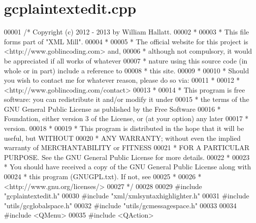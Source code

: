 \hypertarget{gcplaintextedit_8cpp_source}{\section{gcplaintextedit.\-cpp}
}

\begin{DoxyCode}
00001 \textcolor{comment}{/* Copyright (c) 2012 - 2013 by William Hallatt.}
00002 \textcolor{comment}{ *}
00003 \textcolor{comment}{ * This file forms part of "XML Mill".}
00004 \textcolor{comment}{ *}
00005 \textcolor{comment}{ * The official website for this project is <http://www.goblincoding.com> and,}
00006 \textcolor{comment}{ * although not compulsory, it would be appreciated if all works of whatever}
00007 \textcolor{comment}{ * nature using this source code (in whole or in part) include a reference to}
00008 \textcolor{comment}{ * this site.}
00009 \textcolor{comment}{ *}
00010 \textcolor{comment}{ * Should you wish to contact me for whatever reason, please do so via:}
00011 \textcolor{comment}{ *}
00012 \textcolor{comment}{ *                 <http://www.goblincoding.com/contact>}
00013 \textcolor{comment}{ *}
00014 \textcolor{comment}{ * This program is free software: you can redistribute it and/or modify it
       under}
00015 \textcolor{comment}{ * the terms of the GNU General Public License as published by the Free
       Software}
00016 \textcolor{comment}{ * Foundation, either version 3 of the License, or (at your option) any later}
00017 \textcolor{comment}{ * version.}
00018 \textcolor{comment}{ *}
00019 \textcolor{comment}{ * This program is distributed in the hope that it will be useful, but WITHOUT}
00020 \textcolor{comment}{ * ANY WARRANTY; without even the implied warranty of MERCHANTABILITY or
       FITNESS}
00021 \textcolor{comment}{ * FOR A PARTICULAR PURPOSE.  See the GNU General Public License for more
       details.}
00022 \textcolor{comment}{ *}
00023 \textcolor{comment}{ * You should have received a copy of the GNU General Public License along with}
00024 \textcolor{comment}{ * this program (GNUGPL.txt).  If not, see}
00025 \textcolor{comment}{ *}
00026 \textcolor{comment}{ *                    <http://www.gnu.org/licenses/>}
00027 \textcolor{comment}{ */}
00028 
00029 \textcolor{preprocessor}{#include "gcplaintextedit.h"}
00030 \textcolor{preprocessor}{#include "xml/xmlsyntaxhighlighter.h"}
00031 \textcolor{preprocessor}{#include "utils/gcglobalspace.h"}
00032 \textcolor{preprocessor}{#include "utils/gcmessagespace.h"}
00033 
00034 \textcolor{preprocessor}{#include <QMenu>}
00035 \textcolor{preprocessor}{#include <QAction>}

\end{DoxyCode}

